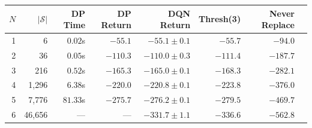 \begin{tabular}{rrrrrrrr}
\toprule
$N$ & $|\mathcal{S}|$ & DP Time & DP Return & DQN Return & Thresh(3) & Never Replace \\
\midrule
1 & 6 & $0.02$s & $-55.1$ & $-55.1 \pm 0.1$ & $-55.7$ & $-94.0$ \\
2 & 36 & $0.05$s & $-110.3$ & $-110.0 \pm 0.3$ & $-111.4$ & $-187.7$ \\
3 & 216 & $0.52$s & $-165.3$ & $-165.0 \pm 0.1$ & $-168.3$ & $-282.1$ \\
4 & 1,296 & $6.38$s & $-220.0$ & $-220.8 \pm 0.1$ & $-223.8$ & $-376.0$ \\
5 & 7,776 & $81.33$s & $-275.7$ & $-276.2 \pm 0.1$ & $-279.5$ & $-469.7$ \\
6 & 46,656 & --- & --- & $-331.7 \pm 1.1$ & $-336.6$ & $-562.8$ \\
\bottomrule
\end{tabular}